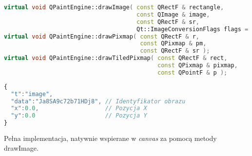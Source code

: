 \begin{lstlisting}[language=C++,numbers=none]
virtual void QPaintEngine::drawImage( const QRectF & rectangle, 
                                      const QImage & image, 
                                      const QRectF & sr, 
                                      Qt::ImageConversionFlags flags = Qt::AutoColor );
virtual void QPaintEngine::drawPixmap( const QRectF & r, 
                                       const QPixmap & pm, 
                                       const QRectF & sr );
virtual void QPaintEngine::drawTiledPixmap( const QRectF & rect, 
                                            const QPixmap & pixmap, 
                                            const QPointF & p );
\end{lstlisting}
\begin{lstlisting}[language=JavaScript,numbers=none]
{
  "t":"image",
  "data":"Ja8SA9c72b71HDj8", // Identyfikator obrazu
  "x":0.0,                   // Pozycja X
  "y":0.0                    // Pozycja Y
}
\end{lstlisting}

Pełna implementacja, natywnie wspierane w \emph{canvas} za pomocą metody drawImage.
